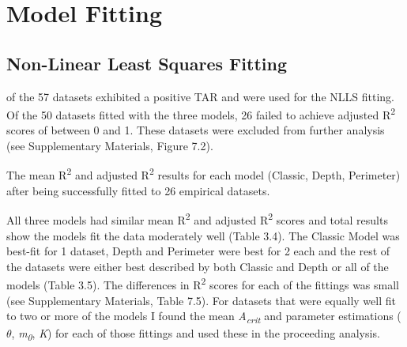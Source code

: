 {\section{Model Fitting}


\subsection{Non-Linear Least Squares Fitting}


 of the 57 datasets exhibited a positive TAR and were used for the NLLS fitting. Of the 50 datasets fitted with the three models, 26 failed to achieve adjusted R\textsuperscript{2} scores of between 0 and 1. These datasets were excluded from further analysis (see Supplementary Materials, Figure 7.2). 

\begin{table}[h!]
  \begin{center}
    \caption{The mean R\textsuperscript{2} and adjusted R\textsuperscript{2} results for each model (Classic, Depth, Perimeter) after being successfully fitted to 26 empirical datasets.}
    \label{table5}
  \end{center}
\end{table}

\noindent All three models had similar mean R\textsuperscript{2} and adjusted R\textsuperscript{2} scores and total results show the models fit the data moderately well (Table 3.4). The Classic Model was best-fit for 1 dataset, Depth and Perimeter were best for 2 each and the rest of the datasets were either best described by both Classic and Depth or all of the models (Table 3.5). The differences in R\textsuperscript{2} scores for each of the fittings was small (see Supplementary Materials, Table 7.5). For datasets that were equally well fit to two or more of the models I found the mean \textit{A\textsubscript{crit}} and parameter estimations ($\theta$, \textit{m\textsubscript{0}}, \textit{K}) for each of those fittings and used these in the proceeding analysis. \\

}
